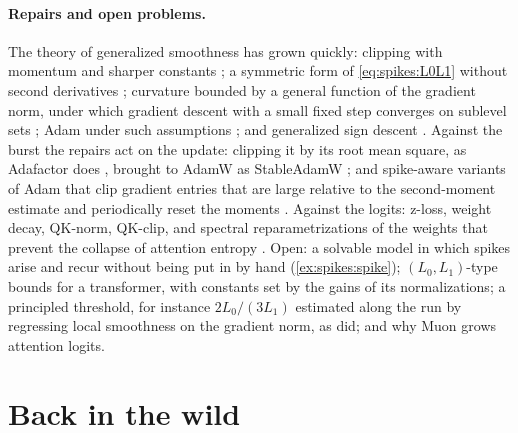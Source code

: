 \begin{refsection}
\paragraph{Repairs and open problems.} The theory of generalized smoothness has grown quickly: clipping with momentum and sharper constants \parencite{ZhangJinFangWang2020}; a symmetric form of \eqref{eq:spikes:L0L1} without second derivatives \parencite{ChenZhouLiangLu2023}; curvature bounded by a general function of the gradient norm, under which gradient descent with a small fixed step converges on sublevel sets \parencite{LiQianTianRakhlinJadbabaie2023}; Adam under such assumptions \parencite{LiRakhlinJadbabaie2023}; and generalized sign descent \parencite{CrawshawEtAl2022}. Against the burst the repairs act on the update: clipping it by its root mean square, as Adafactor does \parencite{ShazeerStern2018}, brought to AdamW as StableAdamW \parencite{WortsmanEtAl2023}; and spike-aware variants of Adam that clip gradient entries that are large relative to the second-moment estimate and periodically reset the moments \parencite{HuangEtAl2025SPAM}. Against the logits: z-loss, weight decay, QK-norm, QK-clip, and spectral reparametrizations of the weights that prevent the collapse of attention entropy \parencite{ZhaiEtAl2023}. Open: a solvable model in which spikes arise and recur without being put in by hand (\cref{ex:spikes:spike}); $(L_0,L_1)$-type bounds for a transformer, with constants set by the gains of its normalizations; a principled threshold, for instance $2L_0/(3L_1)$ estimated along the run by regressing local smoothness on the gradient norm, as \textcite{ZhangHeSraJadbabaie2020} did; and why Muon grows attention logits.

\section{Back in the wild}\label{sec:spikes:back}


\end{refsection}
